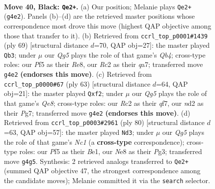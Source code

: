 \documentclass[11pt]{article}
\begin{document}
\clearpage

\begin{figure}[p]\centering
\begin{subfigure}{0.46\textwidth}\centering
\resizebox{\linewidth}{!}{%
\newchessgame
\chessboard[
  setfen={1n2nk2/7Q/7p/p4p1P/P5q1/8/2rN3K/RN6 b - - 4 40},
  showmover=false,
  pgfstyle=straightmove, color=movearrow, markmove={g4-e2}
]}
\caption{}
\end{subfigure}\hfill
\begin{subfigure}{0.46\textwidth}\centering
\resizebox{\linewidth}{!}{%
\newchessgame
\chessboard[
  setfen={1n2r2k/Q5pp/8/1q6/3p3P/3N2P1/5P2/3R2K1 b - - 0 35},
  showmover=false,
  pgfstyle=straightmove, color=movearrow, markmove={b5-b3}
]}
\caption{}
\end{subfigure}
\\[4pt]
\begin{subfigure}{0.46\textwidth}\centering
\resizebox{\linewidth}{!}{%
\newchessgame
\chessboard[
  setfen={8/5Qpk/3p2Np/2n2p2/3p3P/8/2P2PPK/4q3 b - - 4 32},
  showmover=false,
  pgfstyle=straightmove, color=movearrow, markmove={e1-f2}
]}
\caption{}
\end{subfigure}\hfill
\begin{subfigure}{0.46\textwidth}\centering
\resizebox{\linewidth}{!}{%
\newchessgame
\chessboard[
  setfen={7k/1r2n3/r2nQ1pp/2p5/3p3P/6P1/7K/2N1B3 w - - 0 41},
  showmover=false,
  pgfstyle=straightmove, color=movearrow, markmove={c1-d3}
]}
\caption{}
\end{subfigure}
\caption{\textbf{Move 40, Black: \texttt{Qe2+}.} (a) Our position; Melanie plays \texttt{Qe2+} (\texttt{g4e2}). Panels (b)--(d) are the retrieved master positions whose correspondence most drove this move (highest QAP objective among those that transfer to it). (b) Retrieved from \texttt{ccrl\_top\_p0001\#1439} (ply 69) [structural distance $d$=70, QAP obj=27]: the master played \texttt{Qb3}; under $\mu$ our \emph{Qg5} plays the role of that game's \emph{Qb4}; cross-type roles: our \emph{P}f5 as their \emph{R}e8, our \emph{R}c2 as their \emph{q}a7; transferred move \texttt{g4e2} \textbf{(endorses this move)}. (c) Retrieved from \texttt{ccrl\_top\_p0000\#67} (ply 63) [structural distance $d$=64, QAP obj=21]: the master played \texttt{Qxf2}; under $\mu$ our \emph{Qg5} plays the role of that game's \emph{Qe8}; cross-type roles: our \emph{R}c2 as their \emph{q}f7, our \emph{n}d2 as their \emph{P}g7; transferred move \texttt{g4e2} \textbf{(endorses this move)}. (d) Retrieved from \texttt{ccrl\_top\_p0003\#2961} (ply 80) [structural distance $d$=63, QAP obj=57]: the master played \texttt{Nd3}; under $\mu$ our \emph{Qg5} plays the role of that game's \emph{Nc1} (a \textbf{cross-type} correspondence); cross-type roles: our \emph{P}f5 as their \emph{B}e1, our \emph{N}e8 as their \emph{P}g3; transferred move \texttt{g4g5}. Synthesis: 2 retrieved analogs transferred to \texttt{Qe2+} (summed QAP objective 47, the strongest correspondence among the candidate moves); Melanie committed it via the \texttt{search} selector.}
\label{fig:thought-m79}
\end{figure}
\end{document}
